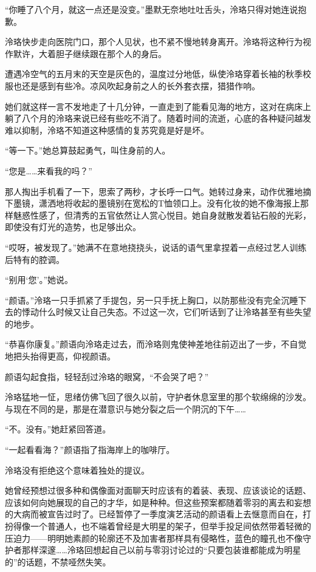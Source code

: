 \documentclass[UTF8, scheme = chinese, openany]{ctexbook}
\begin{document}
“你睡了八个月，就这一点还是没变。”墨默无奈地吐吐舌头，泠珞只得对她连说抱歉。

泠珞快步走向医院门口，那个人见状，也不紧不慢地转身离开。泠珞将这种行为视作默许，大着胆子继续跟在那个人的身后。

遭遇冷空气的五月末的天空是灰色的，温度过分地低，纵使泠珞穿着长袖的秋季校服也还是感到有些冷。凉风吹起身前之人的长外套衣摆，猎猎作响。

她们就这样一言不发地走了十几分钟，一直走到了能看见海的地方，这对在病床上躺了八个月的泠珞来说已经有些吃不消了。随着时间的流逝，心底的各种疑问越发难以抑制，泠珞不知道这种感情的复苏究竟是好是坏。

“等一下。”她总算鼓起勇气，叫住身前的人。

“您是……来看我的吗？”

那人掏出手机看了一下，思索了两秒，才长呼一口气。她转过身来，动作优雅地摘下墨镜，潇洒地将收起的墨镜别在宽松的T恤领口上。没有化妆的她不像海报上那样魅惑性感了，但清秀的五官依然让人赏心悦目。她自身就散发着钻石般的光彩，即使没有灯光的造势，也足够出众。

“哎呀，被发现了。”她满不在意地挠挠头，说话的语气里拿捏着一点经过艺人训练后特有的腔调。

“别用‘您’。”她说。

“颜语。”泠珞一只手抓紧了手提包，另一只手抚上胸口，以防那些没有完全沉睡下去的悸动什么时候又让自己失态。不过这一次，它们听话到了让泠珞甚至有些失望的地步。

“恭喜你康复。”颜语向泠珞走过去，而泠珞则鬼使神差地往前迈出了一步，不自觉地把头抬得更高，仰视颜语。

颜语勾起食指，轻轻刮过泠珞的眼窝，“不会哭了吧？”

泠珞猛地一怔，思绪仿佛飞回了很久以前，守护者休息室里的那个软绵绵的沙发。与现在不同的是，那是在潜意识与她分裂之后一个阴沉的下午……

“不。没有。”她赶紧回答道。

“一起看看海？”颜语指了指海岸上的咖啡厅。

泠珞没有拒绝这个意味着独处的提议。

她曾经预想过很多种和偶像面对面聊天时应该有的着装、表现、应该谈论的话题、应该如何向她展现的自己的才华，如是种种。但这些预案都随着零羽的离去和妄想的大病而被宣告过时了。已经暂停了一季度演艺活动的颜语看上去惬意而自在，打扮得像一个普通人，也不端着曾经是大明星的架子，但举手投足间依然带着轻微的压迫力——明明她素颜的轮廓还不及加害者那样具有侵略性，蓝色的瞳孔也不像守护者那样深邃……泠珞回想起自己以前与零羽讨论过的“只要包装谁都能成为明星的”的话题，不禁哑然失笑。
\end{document}
